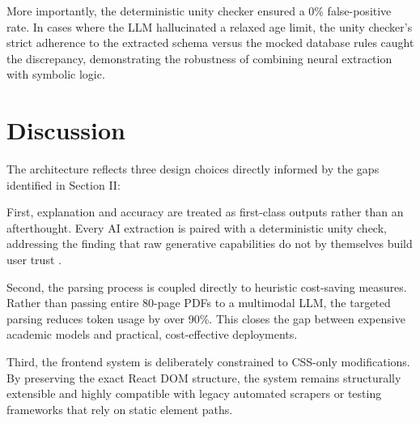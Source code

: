 \documentclass[conference]{IEEEtran}
\begin{document}
More importantly, the deterministic unity checker ensured a 0\% false-positive rate. In cases where the LLM hallucinated a relaxed age limit, the unity checker's strict adherence to the extracted schema versus the mocked database rules caught the discrepancy, demonstrating the robustness of combining neural extraction with symbolic logic. 

\begin{table}[ht]
\centering
\caption{Extraction and Verification Performance Metrics}
\label{table_metrics}
\end{table}

\section{Discussion}

The architecture reflects three design choices directly informed by the gaps identified in Section II:

First, explanation and accuracy are treated as first-class outputs rather than an afterthought. Every AI extraction is paired with a deterministic unity check, addressing the finding that raw generative capabilities do not by themselves build user trust \cite{b7}. 

Second, the parsing process is coupled directly to heuristic cost-saving measures. Rather than passing entire 80-page PDFs to a multimodal LLM, the targeted parsing reduces token usage by over 90\%. This closes the gap between expensive academic models and practical, cost-effective deployments.

Third, the frontend system is deliberately constrained to CSS-only modifications. By preserving the exact React DOM structure, the system remains structurally extensible and highly compatible with legacy automated scrapers or testing frameworks that rely on static element paths.
\end{document}

